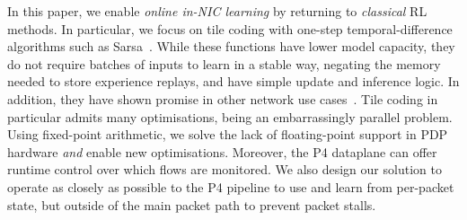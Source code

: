 \documentclass[
conference
,10pt
]{IEEEtran}
\begin{document}




In this paper, we enable \emph{online in-NIC learning} by returning to \emph{classical} RL methods.
In particular, we focus on tile coding with one-step temporal-difference algorithms such as Sarsa~\parencite{RL2E}.
While these functions have lower model capacity, they do not require batches of inputs to learn in a stable way, negating the memory needed to store experience replays, and have simple update and inference logic.
In addition, they have shown promise in other network use cases~\parencite{DBLP:journals/eaai/MalialisK15,DBLP:journals/tnsm/SimpsonRP20}.
Tile coding in particular admits many optimisations, being an embarrassingly parallel problem.
Using fixed-point arithmetic, we solve the lack of floating-point support in PDP hardware \emph{and} enable new optimisations.
Moreover, the P4 dataplane can offer runtime control over which flows are monitored.
We also design our solution to operate as closely as possible to the P4 pipeline to use and learn from per-packet state, but outside of the main packet path to prevent packet stalls.

\end{document}
